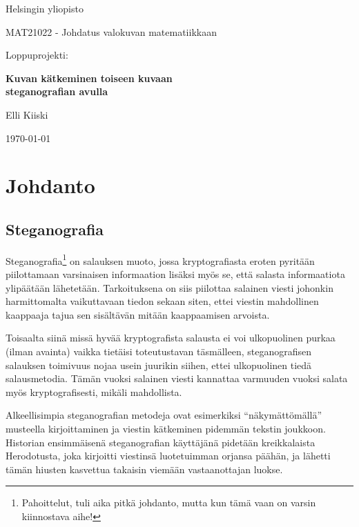 \documentclass[a4paper,11pt]{article}
\begin{document}
{
\thispagestyle{empty}
{\large
Helsingin yliopisto
\par
MAT21022 - Johdatus valokuvan matematiikkaan
}

\vspace{7cm}

{\huge
Loppuprojekti:}
\par
{\Large \bf Kuvan kätkeminen toiseen kuvaan \\steganografian avulla}

\vspace{2cm}

{\Large Elli Kiiski}

\vfill

{\large \today}
}

\clearpage

\tableofcontents

\clearpage

\section{Johdanto}

\subsection{Steganografia}
Steganografia\footnote{Pahoittelut, tuli aika pitkä johdanto, mutta kun tämä vaan on varsin kiinnostava aihe!} on salauksen muoto, jossa kryptografiasta eroten pyritään piilottamaan varsinaisen informaation lisäksi myös se, että salasta informaatiota ylipäätään lähetetään. Tarkoituksena on siis piilottaa salainen viesti johonkin harmittomalta vaikuttavaan tiedon sekaan siten, ettei viestin mahdollinen kaappaaja tajua sen sisältävän mitään kaappaamisen arvoista.

Toisaalta siinä missä hyvää kryptografista salausta ei voi ulkopuolinen purkaa (ilman avainta) vaikka tietäisi toteutustavan täsmälleen, steganografisen salauksen toimivuus nojaa usein juurikin siihen, ettei ulkopuolinen tiedä salausmetodia. Tämän vuoksi salainen viesti kannattaa varmuuden vuoksi salata myös kryptografisesti, mikäli mahdollista.

Alkeellisimpia steganografian metodeja ovat esimerkiksi \enquote{näkymättömällä} musteella kirjoittaminen ja viestin kätkeminen pidemmän tekstin joukkoon. Historian ensimmäisenä steganografian käyttäjänä pidetään kreikkalaista Herodotusta, joka kirjoitti viestinsä luotetuimman orjansa päähän, ja lähetti tämän hiusten kasvettua takaisin viemään vastaanottajan luokse.
\end{document}
